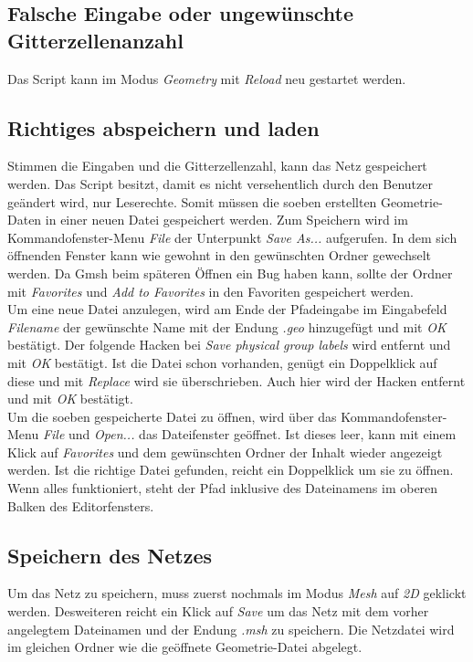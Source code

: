 \documentclass[a4paper,twocolumn]{article}
\begin{document}
\subsection{Falsche Eingabe oder ungewünschte Gitterzellenanzahl}
Das Script kann im Modus \textit{Geometry} mit \emph{Reload} neu gestartet werden.

\subsection{Richtiges abspeichern und laden}
Stimmen die Eingaben und die Gitterzellenzahl, kann das Netz gespeichert werden. Das Script besitzt, damit es nicht versehentlich durch den Benutzer geändert 
wird, nur Leserechte. Somit müssen die soeben erstellten Geometrie-Daten in einer neuen Datei gespeichert werden. Zum Speichern wird im Kommandofenster-Menu \emph{File} 
der Unterpunkt \emph{Save As...} aufgerufen. In dem sich öffnenden Fenster kann wie gewohnt in den gewünschten Ordner gewechselt werden. Da Gmsh beim späteren Öffnen 
ein Bug haben kann, sollte der Ordner mit \textit{Favorites} und \textit{Add to Favorites} in den Favoriten gespeichert werden.\\
Um eine neue Datei anzulegen, wird am Ende der Pfadeingabe im Eingabefeld \emph{Filename} der gewünschte Name mit der Endung \textit{.geo} hinzugefügt und mit \emph{OK} 
bestätigt. Der folgende Hacken bei \textit{Save physical group labels} wird entfernt und mit \emph{OK} bestätigt. Ist die Datei schon vorhanden, genügt ein Doppelklick auf diese und mit \emph{Replace} wird sie überschrieben. Auch hier wird der Hacken entfernt und mit \emph{OK} bestätigt.\\
Um die soeben gespeicherte Datei zu öffnen, wird über das Kommandofenster-Menu \emph{File} und \emph{Open...} das Dateifenster geöffnet. Ist dieses leer, kann mit einem 
Klick auf \textit{Favorites} und dem gewünschten Ordner der Inhalt wieder angezeigt werden. Ist die richtige Datei gefunden, reicht ein Doppelklick um sie zu öffnen. 
Wenn alles funktioniert, steht der Pfad inklusive des Dateinamens im oberen Balken des Editorfensters.
\subsection{Speichern des Netzes}
Um das Netz zu speichern, muss zuerst nochmals im Modus \emph{Mesh} auf \emph{2D} geklickt werden. Desweiteren reicht ein Klick auf \emph{Save} um das Netz
mit dem vorher angelegtem Dateinamen und der Endung \textit{.msh} zu speichern. Die Netzdatei wird im gleichen Ordner wie die geöffnete Geometrie-Datei abgelegt.
\end{document}

